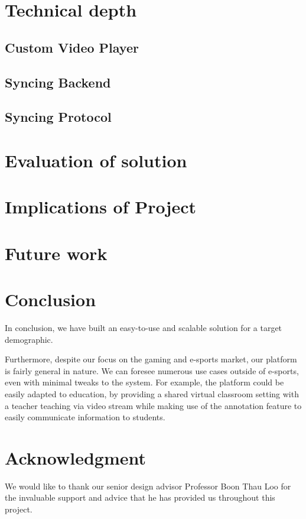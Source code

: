 \documentclass[conference]{IEEEtran}
\begin{document}
\section{Technical depth}
\subsection{Custom Video Player}

\subsection{Syncing Backend}

\subsection{Syncing Protocol}

\section{Evaluation of solution}

\section{Implications of Project}

\section{Future work}

\section{Conclusion}

  In conclusion, we have built an easy-to-use and scalable solution for a target demographic.

  Furthermore, despite our focus on the gaming and e-sports market, our platform is fairly general in nature. We can foresee numerous use cases outside of e-sports, even with minimal tweaks to the system. For example, the platform could be easily adapted to education, by providing a shared virtual classroom setting with a teacher teaching via video stream while making use of the annotation feature to easily communicate information to students.

\section*{Acknowledgment}
We would like to thank our senior design advisor Professor Boon Thau Loo for the invaluable support and advice that he has provided us throughout this project.
\end{document}
